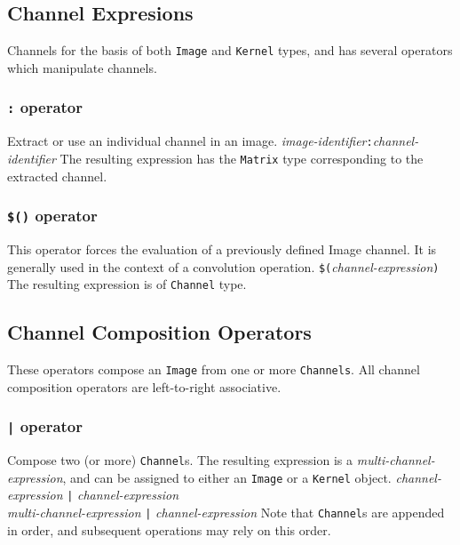 \subsection{Channel Expresions}
\label{ssec:channelexpressions}
Channels for the basis of both \texttt{Image} and \texttt{Kernel} types, and
\sys{} has several operators which manipulate channels.

\subsubsection{\texttt{:} operator}
\label{sssec:colonop}
Extract or use an individual channel in an image.
\startsyn
\emph{image-identifier}\texttt{:}\emph{channel-identifier}
\stopsyn
The resulting expression has the \texttt{Matrix} type corresponding to the
extracted channel.

\subsubsection{\texttt{\$()} operator}
\label{sssec:evalop}
This operator forces the evaluation of a previously defined Image channel. It
is generally used in the context of a convolution operation.
\startsyn
\texttt{\$(}\emph{channel-expression}\texttt{)}
\stopsyn
The resulting expression is of \texttt{Channel} type.

\subsection{Channel Composition Operators}
\label{ssec:channelops}
These operators compose an \texttt{Image} from one or more \texttt{Channels}.
All channel composition operators are left-to-right associative.

\subsubsection{\texttt{|} operator}
\label{sssec:barop}
Compose two (or more) \texttt{Channel}s. The resulting expression is a
\emph{multi-channel-expression}, and can be assigned to either an \texttt{Image}
or a \texttt{Kernel} object.
\startsyn
\emph{channel-expression} \texttt{|} \emph{channel-expression} \\
\emph{multi-channel-expression} \texttt{|} \emph{channel-expression}
\stopsyn
Note that \texttt{Channel}s are appended in order, and subsequent operations
may rely on this order.

